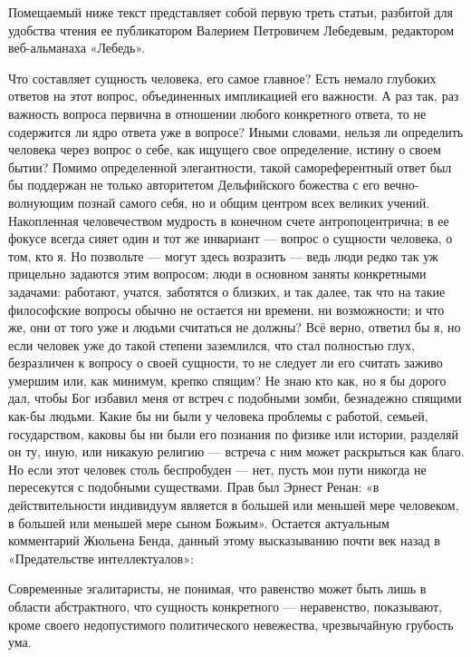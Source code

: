\begin{multicols}{3}
\setlength{\parindent}{0pt}

Помещаемый ниже текст представляет собой первую треть статьи, разбитой для
удобства чтения ее публикатором Валерием Петровичем Лебедевым, редактором
веб-альманаха «Лебедь». 


Что составляет сущность человека, его самое главное? Есть немало глубоких
ответов на этот вопрос, объединенных импликацией его важности. А раз так, раз
важность вопроса первична в отношении любого конкретного ответа, то не
содержится ли ядро ответа уже в вопросе? Иными словами, нельзя ли определить
человека через вопрос о себе, как ищущего свое определение, истину о своем
бытии? Помимо определенной элегантности, такой самореферентный ответ был бы
поддержан не только авторитетом Дельфийского божества с его вечно-волнующим
познай самого себя, но и общим центром всех великих учений. Накопленная
человечеством мудрость в конечном счете антропоцентрична; в ее фокусе всегда
сияет один и тот же инвариант — вопрос о сущности человека, о том, кто я. Но
позвольте — могут здесь возразить — ведь люди редко так уж прицельно задаются
этим вопросом; люди в основном заняты конкретными задачами: работают, учатся,
заботятся о близких, и так далее, так что на такие философские вопросы обычно
не остается ни времени, ни возможности; и что же, они от того уже и людьми
считаться не должны? Всё верно, ответил бы я, но если человек уже до такой
степени заземлился, что стал полностью глух, безразличен к вопросу о своей
сущности, то не следует ли его считать заживо умершим или, как минимум, крепко
спящим? Не знаю кто как, но я бы дорого дал, чтобы Бог избавил меня от встреч с
подобными зомби, безнадежно спящими как-бы людьми. Какие бы ни были у человека
проблемы с работой, семьей, государством, каковы бы ни были его познания по
физике или истории, разделяй он ту, иную, или никакую религию — встреча с ним
может раскрыться как благо. Но если этот человек столь беспробуден — нет, пусть
мои пути никогда не пересекутся с подобными существами. Прав был Эрнест Ренан:
«в действительности индивидуум является в большей или меньшей мере человеком, в
большей или меньшей мере сыном Божьим». Остается актуальным комментарий Жюльена
Бенда, данный этому высказыванию почти век назад в «Предательстве
интеллектуалов»:

Современные эгалитаристы, не понимая, что равенство может быть лишь в области
абстрактного, что сущность конкретного — неравенство, показывают, кроме своего
недопустимого политического невежества, чрезвычайную грубость ума.


\end{multicols}
